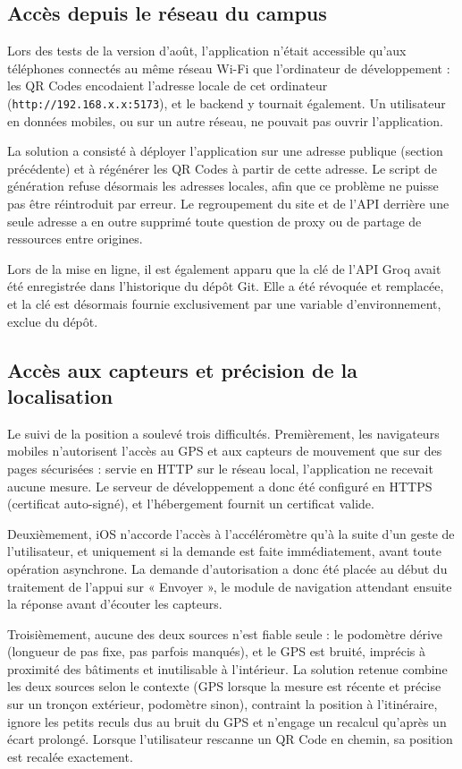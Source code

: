 \documentclass[12pt,a4paper]{report}
\begin{document}
\subsection{Accès depuis le réseau du campus}

Lors des tests de la version d'août, l'application n'était accessible qu'aux téléphones connectés
au même réseau Wi-Fi que l'ordinateur de développement : les QR Codes encodaient l'adresse locale
de cet ordinateur (\texttt{http://192.168.x.x:5173}), et le backend y tournait également. Un
utilisateur en données mobiles, ou sur un autre réseau, ne pouvait pas ouvrir l'application.

La solution a consisté à déployer l'application sur une adresse publique (section précédente) et à
régénérer les QR Codes à partir de cette adresse. Le script de génération refuse désormais les
adresses locales, afin que ce problème ne puisse pas être réintroduit par erreur. Le regroupement
du site et de l'API derrière une seule adresse a en outre supprimé toute question de proxy ou de
partage de ressources entre origines.

Lors de la mise en ligne, il est également apparu que la clé de l'API Groq avait été enregistrée
dans l'historique du dépôt Git. Elle a été révoquée et remplacée, et la clé est désormais fournie
exclusivement par une variable d'environnement, exclue du dépôt.

\subsection{Accès aux capteurs et précision de la localisation}

Le suivi de la position a soulevé trois difficultés. Premièrement, les navigateurs mobiles
n'autorisent l'accès au GPS et aux capteurs de mouvement que sur des pages sécurisées : servie en
HTTP sur le réseau local, l'application ne recevait aucune mesure. Le serveur de développement a
donc été configuré en HTTPS (certificat auto-signé), et l'hébergement fournit un certificat valide.

Deuxièmement, iOS n'accorde l'accès à l'accéléromètre qu'à la suite d'un geste de l'utilisateur, et
uniquement si la demande est faite immédiatement, avant toute opération asynchrone. La demande
d'autorisation a donc été placée au début du traitement de l'appui sur « Envoyer », le module de
navigation attendant ensuite la réponse avant d'écouter les capteurs.

Troisièmement, aucune des deux sources n'est fiable seule : le podomètre dérive (longueur de pas
fixe, pas parfois manqués), et le GPS est bruité, imprécis à proximité des bâtiments et inutilisable
à l'intérieur. La solution retenue combine les deux sources selon le contexte (GPS lorsque la mesure
est récente et précise sur un tronçon extérieur, podomètre sinon), contraint la position à
l'itinéraire, ignore les petits reculs dus au bruit du GPS et n'engage un recalcul qu'après un écart
prolongé. Lorsque l'utilisateur rescanne un QR Code en chemin, sa position est recalée exactement.
\end{document}
